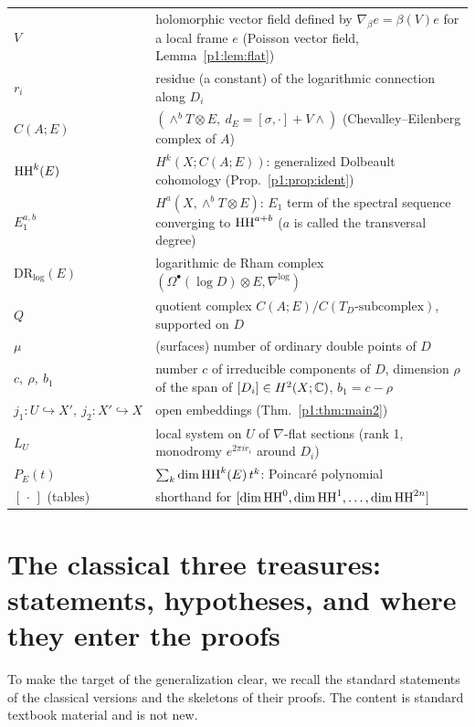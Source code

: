 \begin{longtable}{>{\raggedright\arraybackslash}p{3.4cm}>{\raggedright\arraybackslash}p{11.6cm}}
$V$ & holomorphic vector field defined by $\nabla_\beta e=\beta(V)e$ for a local frame $e$ (Poisson vector field, Lemma~\ref{p1:lem:flat})\\
$r_i$ & residue (a constant) of the logarithmic connection along $D_i$\\
$C(A;E)$ & $(\wedge^bT\otimes E,\ d_E=[\sigma,\cdot]+V\wedge)$ (Chevalley--Eilenberg complex of $A$)\\
$\mathrm{HH}^k(E)$ & $H^k(X;C(A;E))$: generalized Dolbeault cohomology (Prop.~\ref{p1:prop:ident})\\
$E_1^{a,b}$ & $H^a(X,\wedge^bT\otimes E)$: $E_1$ term of the spectral sequence converging to $\mathrm{HH}^{a+b}$ ($a$ is called the transversal degree)\\
$\mathrm{DR}_{\log}(E)$ & logarithmic de Rham complex $(\Omega^\bullet(\log D)\otimes E,\nabla^{\log})$\\
$Q$ & quotient complex $C(A;E)/C(T_D\text{-subcomplex})$, supported on $D$\\
$\mu$ & (surfaces) number of ordinary double points of $D$\\
$c,\ \rho,\ b_1$ & number $c$ of irreducible components of $D$, dimension $\rho$ of the span of $[D_i]\in H^2(X;\mathbb C)$, $b_1=c-\rho$\\
$j_1:U\hookrightarrow X',\ j_2:X'\hookrightarrow X$ & open embeddings (Thm.~\ref{p1:thm:main2})\\
$L_U$ & local system on $U$ of $\nabla$-flat sections (rank 1, monodromy $e^{2\pi ir_i}$ around $D_i$)\\
$P_E(t)$ & $\sum_k\dim\mathrm{HH}^k(E)\,t^k$: Poincar\'e polynomial\\
$[\,\cdot\,]$ (tables) & shorthand for $[\dim\mathrm{HH}^0,\dim\mathrm{HH}^1,\dots,\dim\mathrm{HH}^{2n}]$\\
\bottomrule
\end{longtable}

\section{The classical three treasures: statements, hypotheses, and where they enter the proofs}\label{p1:sec:classical}
To make the target of the generalization clear, we recall the standard statements of the classical versions and the skeletons of their proofs. The content is standard textbook material and is not new.

